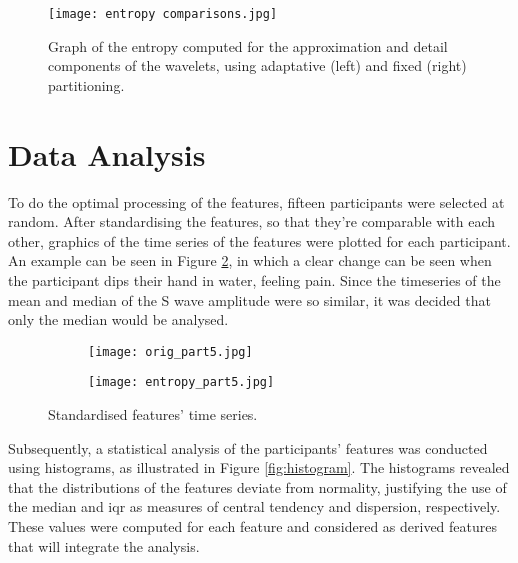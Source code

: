 \begin{figure}[h!]
    \centering
    \texttt{[image: entropy comparisons.jpg]}
    \caption{Graph of the entropy computed for the approximation and detail components of the wavelets, using adaptative (left) and fixed (right) partitioning.}
    \label{fig:entropies}
\end{figure}



\section{Data Analysis}
To do the optimal processing of the features, fifteen participants were selected at random. After standardising the features, so that they're comparable with each other, graphics of the time series of the features were plotted for each participant. An example can be seen in Figure \ref{fig:featurestimeseries}, in which a clear change can be seen when the participant dips their hand in water, feeling pain. Since the timeseries of the mean and median of the S wave amplitude were so similar, it was decided that only the median would be analysed.


\begin{figure}[htbp]
    \centering
    \begin{subfigure}{\linewidth}
        \centering
        \texttt{[image: orig\_part5.jpg]}
    \end{subfigure}
    
    \vspace{0.1em} %
    
    \begin{subfigure}{\linewidth}
        \centering
        \texttt{[image: entropy\_part5.jpg]}
    \end{subfigure}
    
    \caption{Standardised features' time series.}
    \label{fig:featurestimeseries}
\end{figure}


Subsequently, a statistical analysis of the participants' features was conducted using histograms, as illustrated in Figure \ref{fig:histogram}. The histograms revealed that the distributions of the features deviate from normality, justifying the use of the median and \ac{iqr} as measures of central tendency and dispersion, respectively.
These values were computed for each feature and considered as derived features that will integrate the analysis.

